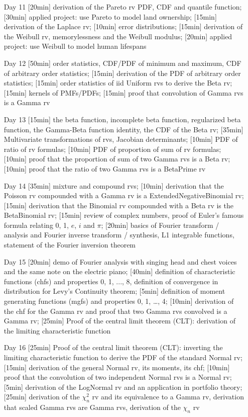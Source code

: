 \begin{enumerate}
\item[Day 11] [20min] derivation of the Pareto rv PDF, CDF and quantile function; [30min] applied project: use Pareto to model land ownership; [15min] derivation of the Laplace rv; [10min] error distributions; [15min] derivation of the Weibull rv, memorylessness and the Weibull modulus; [20min] applied project: use Weibull to model human lifespans

\item[Day 12] [50min] order statistics, CDF/PDF of minimum and maximum, CDF of arbitrary order statistics; [15min] derivation of the PDF of arbitrary order statistics; [15min] order statistics of iid Uniform rvs to derive the Beta rv; [15min] kernels of PMFs/PDFs; [15min] proof that convolution of Gamma rvs is a Gamma rv

\item[Day 13]  [15min] the beta function, incomplete beta function, regularized beta function, the Gamma-Beta function identity, the CDF of the Beta rv; [35min] Multivariate transformations of rvs, Jacobian determinants; [10min] PDF of ratio of rv formulas; [10min] PDF of proportion of sum of rv formulas; [10min] proof that the proportion of sum of two Gamma rvs is a Beta rv; [10min] proof that the ratio of two Gamma rvs is a BetaPrime rv

\item[Day 14]  [35min] mixture and compound rvs; [10min] derivation that the Poisson rv compounded with a Gamma rv is a ExtendedNegativeBinomial rv; [15min] derivation that the Binomial rv compounded with a Beta rv is the BetaBinomial rv; [15min] review of complex numbers, proof of Euler's famous formula relating 0, 1, $e$, $i$ and $\pi$; [20min] basics of Fourier transform / analysis and Fourier inverse transform / synthesis, L1 integrable functions, statement of the Fourier inversion theorem

\item[Day 15] [20min] demo of Fourier analysis with singing head and chest voices and the same note on the electric piano; [40min] definition of characteristic functions (chfs) and properties 0, 1, ..., 8, definition of convergence in distribution for Levy's Continuity theorem; [5min] definition of moment generating functions (mgfs) and properties 0, 1, \ldots, 4; [10min] derivation of the chf for the Gamma rv and proof that two Gamma rvs convolved is a Gamma rv; [25min] Proof of the central limit theorem (CLT): derivation of the limiting characteristic function
 

\item[Day 16] [25min] Proof of the central limit theorem (CLT): inverting the limiting characteristic function to derive the PDF of the standard Normal rv; [15min] derivation of the general Normal rv, its moments, its chf; [10min] proof that the convolution of two independent Normal rvs is a Normal rv; [5min] derivation of the LogNormal rv and an application in portfolio theory; [25min] derivation of the $\chi^2_n$ rv and its equivalence to a Gamma rv, derivation that scaled Gamma rvs are Gamma rvs, derivation of the $\chi_n$ rv


\end{enumerate}
